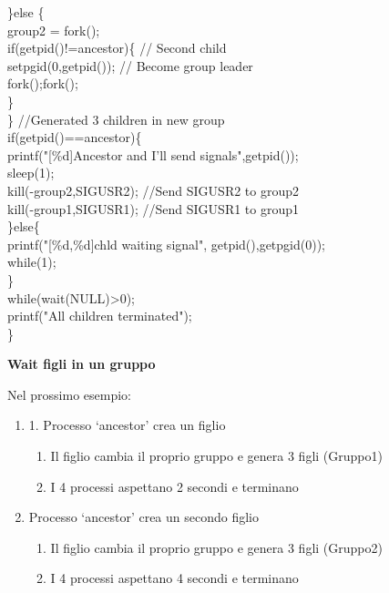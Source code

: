 \begin{flushleft}
\begin{flushleft}
\begin{flushleft}
{      \halftab \}else \{ \\
      \tab group2 = fork();\\
      \tab if(getpid()!=ancestor)\{ // Second child\\
      \tab \halftab setpgid(0,getpid()); // Become group leader\\
      \tab \halftab fork();fork();\\ 
      \tab \}\\
      \halftab \} //Generated 3 children in new group\\
      \halftab if(getpid()==ancestor)\{\\
      \tab printf("[\%d]Ancestor and I'll send signals\n",getpid());\\
      \tab sleep(1);\\
      \tab kill(-group2,SIGUSR2); //Send SIGUSR2 to group2\\
      \tab kill(-group1,SIGUSR1); //Send SIGUSR1 to group1\\
      \halftab \}else\{\\
      \tab printf("[\%d,\%d]chld waiting signal\n", getpid(),getpgid(0));\\
      \tab while(1);\\
      \halftab \} \\
      \halftab while(wait(NULL)>0);\\
      \halftab printf("All children terminated\n");\\
      \}}
    \end{flushleft}
    \begin{flushleft}
      \textbf{Wait figli in un gruppo}\par 
      Nel prossimo esempio:
      \begin{enumerate}
        \item 1. Processo ‘ancestor’ crea un figlio
        \begin{enumerate}
          \item Il figlio cambia il proprio gruppo e genera 3 figli (Gruppo1)
          \item I 4 processi aspettano 2 secondi e terminano
        \end{enumerate}
        \item Processo ‘ancestor’ crea un secondo figlio
        \begin{enumerate}
          \item Il figlio cambia il proprio gruppo e genera 3 figli (Gruppo2)
          \item I 4 processi aspettano 4 secondi e terminano

\end{enumerate}
\end{enumerate}
\end{flushleft}
\end{flushleft}
\end{flushleft}

